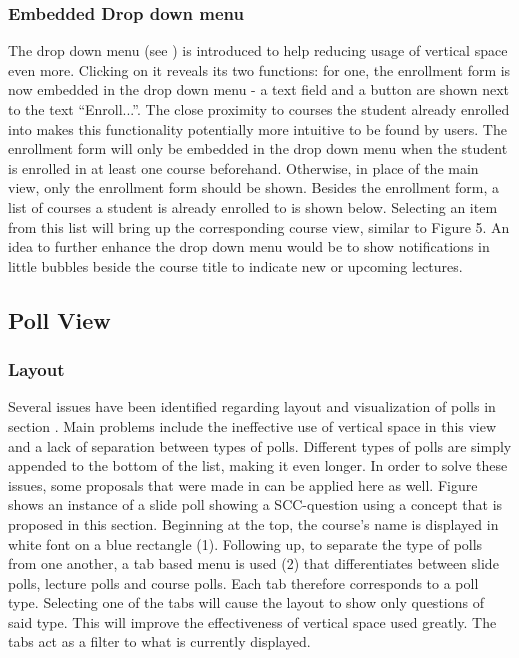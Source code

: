 \subsubsection{Embedded Drop down menu}
The drop down menu (see \todogrf) is introduced to help reducing usage of vertical space even more. Clicking on it reveals its two functions: for one, the enrollment form is now embedded in the drop down menu - a text field and a button are shown next to the text “Enroll...”. The close proximity to courses the student already enrolled into makes this functionality potentially more intuitive to be found by users. The enrollment form will only be embedded in the drop down menu when the student is enrolled in at least one course beforehand. Otherwise, in place of the main view, only the enrollment form should be shown. Besides the enrollment form, a list of courses a student is already enrolled to is shown below. Selecting an item from this list will bring up the corresponding course view, similar to Figure 5.
 An idea to further enhance the drop down menu would be to show notifications in little bubbles beside the course title to indicate new or upcoming lectures.


\subsection{Poll View}

\subsubsection{Layout}
Several issues have been identified regarding layout and visualization of polls in section \todosct. Main problems include the ineffective use of vertical space in this view and a lack of separation between types of polls. Different types of polls are simply appended to the bottom of the list, making it even longer. In order to solve these issues, some proposals that were made in \todosct can be applied here as well.  Figure \todosct shows an instance of a slide poll showing a SCC-question using a concept that is proposed in this section.
Beginning at the top, the course's name is displayed in white font on a blue rectangle (1). Following up, to separate the type of polls from one another, a tab based menu is used (2) that differentiates between slide polls, lecture polls and course polls. Each tab therefore corresponds to a poll type. Selecting one of the tabs will cause the layout to show only questions of said type. This will improve the effectiveness of vertical space used greatly. The tabs act as a filter to what is currently displayed.

